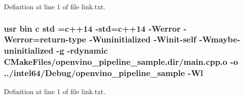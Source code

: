 Definition at line 1 of file link.\+txt.

\subsubsection[{\texorpdfstring{std}{std}}]{\setlength{\rightskip}{0pt plus 5cm}usr bin {\bf c} std ={\bf c}++14 -\/std={\bf c}++14 -\/Werror -\/Werror=return-\/type -\/Wuninitialized -\/Winit-\/self -\/Wmaybe-\/uninitialized -\/g -\/rdynamic C\+Make\+Files/openvino\+\_\+pipeline\+\_\+sample.\+dir/main.\+cpp.\+o -\/o ../intel64/Debug/openvino\+\_\+pipeline\+\_\+sample -\/{\bf Wl}}\hypertarget{sample_2CMakeFiles_2openvino__pipeline__sample_8dir_2link_8txt_a1ccfea5f558575a112db71eeb271fabf}{}\label{sample_2CMakeFiles_2openvino__pipeline__sample_8dir_2link_8txt_a1ccfea5f558575a112db71eeb271fabf}


Definition at line 1 of file link.\+txt.

